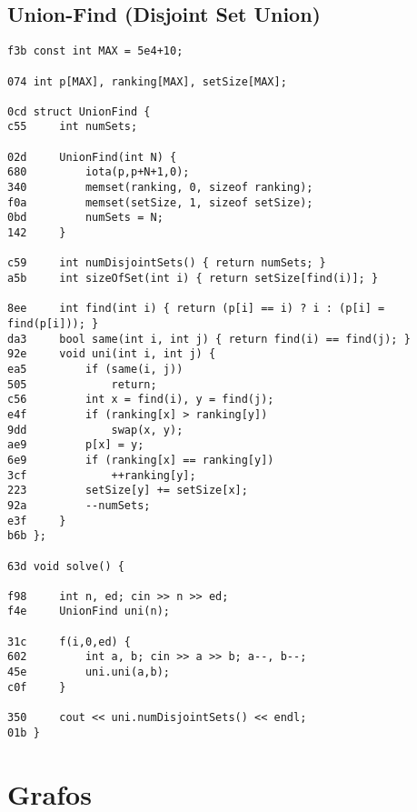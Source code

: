 \documentclass[11pt, a4paper, twoside]{article}
\begin{document}
\subsection{Union-Find (Disjoint Set Union)}
\begin{lstlisting}
f3b const int MAX = 5e4+10;

074 int p[MAX], ranking[MAX], setSize[MAX];

0cd struct UnionFind {
c55     int numSets;
    
02d     UnionFind(int N) {
680 		iota(p,p+N+1,0);
340 		memset(ranking, 0, sizeof ranking);
f0a 		memset(setSize, 1, sizeof setSize);
0bd         numSets = N;
142     }
    
c59     int numDisjointSets() { return numSets; }
a5b     int sizeOfSet(int i) { return setSize[find(i)]; }
    
8ee     int find(int i) { return (p[i] == i) ? i : (p[i] = find(p[i])); }
da3     bool same(int i, int j) { return find(i) == find(j); }
92e     void uni(int i, int j) {
ea5         if (same(i, j))
505             return;
c56         int x = find(i), y = find(j);
e4f         if (ranking[x] > ranking[y])
9dd             swap(x, y);
ae9         p[x] = y;
6e9         if (ranking[x] == ranking[y])
3cf             ++ranking[y];
223         setSize[y] += setSize[x];
92a         --numSets;
e3f     }
b6b };

63d void solve() {
    
f98 	int n, ed; cin >> n >> ed;
f4e 	UnionFind uni(n);
    
31c 	f(i,0,ed) {
602 		int a, b; cin >> a >> b; a--, b--;
45e 		uni.uni(a,b);
c0f 	}
    
350 	cout << uni.numDisjointSets() << endl;
01b }
\end{lstlisting}



%
%

\section{Grafos}
\end{document}

